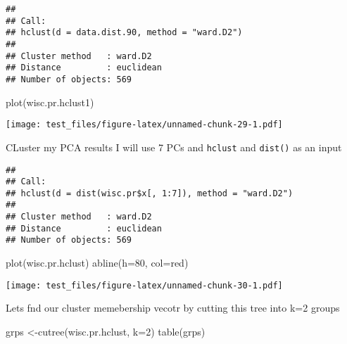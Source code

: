 \documentclass[
]{article}
\newenvironment{Shaded}{\begin{snugshade}}{\end{snugshade}}
\newcommand{\AttributeTok}[1]{\textcolor[rgb]{0.77,0.63,0.00}{#1}}
\newcommand{\DecValTok}[1]{\textcolor[rgb]{0.00,0.00,0.81}{#1}}
\newcommand{\FunctionTok}[1]{\textcolor[rgb]{0.00,0.00,0.00}{#1}}
\newcommand{\NormalTok}[1]{#1}
\newcommand{\OtherTok}[1]{\textcolor[rgb]{0.56,0.35,0.01}{#1}}
\newcommand{\SpecialCharTok}[1]{\textcolor[rgb]{0.00,0.00,0.00}{#1}}
\newcommand{\StringTok}[1]{\textcolor[rgb]{0.31,0.60,0.02}{#1}}
\begin{document}
\begin{verbatim}
## 
## Call:
## hclust(d = data.dist.90, method = "ward.D2")
## 
## Cluster method   : ward.D2 
## Distance         : euclidean 
## Number of objects: 569
\end{verbatim}

\begin{Shaded}
\begin{Highlighting}[]
\FunctionTok{plot}\NormalTok{(wisc.pr.hclust1)}
\end{Highlighting}
\end{Shaded}

\texttt{[image: test\_files/figure-latex/unnamed-chunk-29-1.pdf]}

CLuster my PCA results I will use 7 PCs and \texttt{hclust} and
\texttt{dist()} as an input

\begin{Shaded}
\end{Shaded}

\begin{verbatim}
## 
## Call:
## hclust(d = dist(wisc.pr$x[, 1:7]), method = "ward.D2")
## 
## Cluster method   : ward.D2 
## Distance         : euclidean 
## Number of objects: 569
\end{verbatim}

\begin{Shaded}
\begin{Highlighting}[]
\FunctionTok{plot}\NormalTok{(wisc.pr.hclust)}
\FunctionTok{abline}\NormalTok{(}\AttributeTok{h=}\DecValTok{80}\NormalTok{, }\AttributeTok{col=}\StringTok{\textquotesingle{}red\textquotesingle{}}\NormalTok{)}
\end{Highlighting}
\end{Shaded}

\texttt{[image: test\_files/figure-latex/unnamed-chunk-30-1.pdf]}

Lets fnd our cluster memebership vecotr by cutting this tree into k=2
groups

\begin{Shaded}
\begin{Highlighting}[]
\NormalTok{grps }\OtherTok{\textless{}{-}}\FunctionTok{cutree}\NormalTok{(wisc.pr.hclust, }\AttributeTok{k=}\DecValTok{2}\NormalTok{)}
\FunctionTok{table}\NormalTok{(grps)}
\end{Highlighting}
\end{Shaded}
\end{document}
